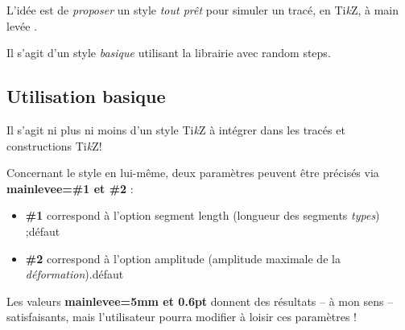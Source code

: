 \documentclass[a4paper,french,11pt]{article}
\providecommand\tikzlogo{Ti\textit{k}Z}
\let\TikZ\tikzlogo
\newcommand\ctex[1]{\tcbox[vignettelatex]{#1}}
\newcommand\Cle[1]{{\bfseries\sffamily\textlangle #1\textrangle}}
\begin{document}
\begin{codeidee}
L'idée est de \textit{proposer} un style \textit{tout prêt} pour simuler un tracé, en \TikZ, à \og main levée \fg.

Il s'agit d'un style \textit{basique} utilisant la librairie \ctex{decorations} avec \textsf{random steps}.
\end{codeidee}

\begin{codetex}
\end{codetex}

\subsection{Utilisation basique}

\begin{codeinfo}
Il s'agit ni plus ni moins d'un style \TikZ{} à intégrer dans les tracés et constructions \TikZ !
\end{codeinfo}

\begin{codecles}
Concernant le style en lui-même, deux paramètres peuvent être précisés via \Cle{mainlevee=\#1 et \#2} :

\begin{itemize}
	\item \Cle{\#1} correspond à l'option \textsf{segment length} (longueur des segments \textit{types}) ;\hfill{}défaut \Cle{5mm}
	\item \Cle{\#2} correspond à l'option \textsf{amplitude} (amplitude maximale de la \textit{déformation}).\hfill{}défaut \Cle{0.6pt}
\end{itemize}

Les valeurs \Cle{mainlevee=5mm et 0.6pt} donnent des résultats -- à mon sens -- satisfaisants, mais l'utilisateur pourra modifier à loisir ces paramètres !
\end{codecles}

\begin{codetex}


\end{codetex}
\end{document}
